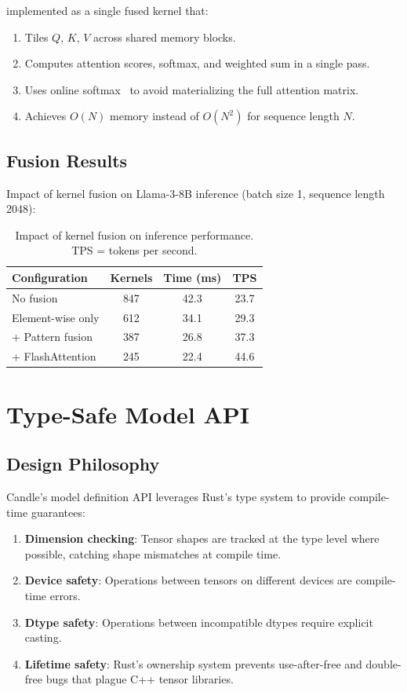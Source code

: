 \documentclass[11pt,twocolumn]{article}
\begin{document}
implemented as a single fused kernel that:
\begin{enumerate}[leftmargin=1.4em]
    \item Tiles $Q$, $K$, $V$ across shared memory blocks.
    \item Computes attention scores, softmax, and weighted sum in a single pass.
    \item Uses online softmax~\cite{milakov2018online} to avoid materializing the full attention matrix.
    \item Achieves $O(N)$ memory instead of $O(N^2)$ for sequence length $N$.
\end{enumerate}

\subsection{Fusion Results}

Impact of kernel fusion on Llama-3-8B inference (batch size 1, sequence length 2048):

\begin{table}[H]
\centering
\small
\begin{tabular}{lccc}
\toprule
\textbf{Configuration} & \textbf{Kernels} & \textbf{Time (ms)} & \textbf{TPS} \\
\midrule
No fusion & 847 & 42.3 & 23.7 \\
Element-wise only & 612 & 34.1 & 29.3 \\
+ Pattern fusion & 387 & 26.8 & 37.3 \\
+ FlashAttention & 245 & 22.4 & 44.6 \\
\bottomrule
\end{tabular}
\caption{Impact of kernel fusion on inference performance. TPS = tokens per second.}
\label{tab:fusion_results}
\end{table}

\section{Type-Safe Model API}
\label{sec:api}

\subsection{Design Philosophy}

Candle's model definition API leverages Rust's type system to provide compile-time guarantees:

\begin{enumerate}[leftmargin=1.4em]
    \item \textbf{Dimension checking}: Tensor shapes are tracked at the type level where possible, catching shape mismatches at compile time.
    \item \textbf{Device safety}: Operations between tensors on different devices are compile-time errors.
    \item \textbf{Dtype safety}: Operations between incompatible dtypes require explicit casting.
    \item \textbf{Lifetime safety}: Rust's ownership system prevents use-after-free and double-free bugs that plague C++ tensor libraries.
\end{enumerate}
\end{document}
